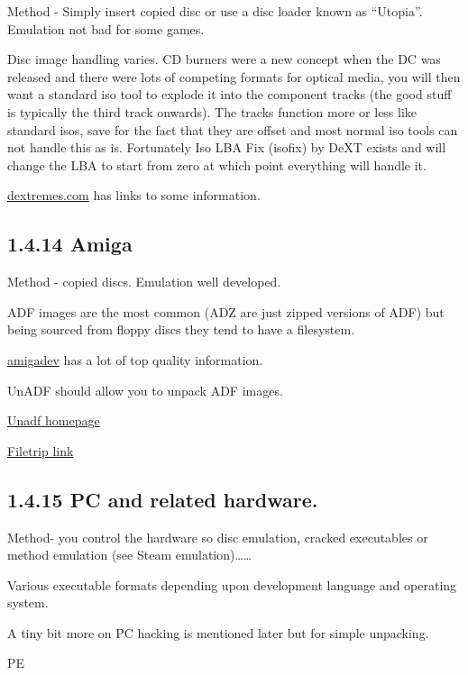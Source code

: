 \documentclass[
]{book}
\begin{document}
Method - Simply insert copied disc or use a disc loader known as ``Utopia''. Emulation not bad for some games.

Disc image handling varies. CD burners were a new concept when the DC was released and there were lots of competing formats for optical media, you will then want a standard iso tool to explode it into the component tracks (the good stuff is typically the third track onwards). The tracks function more or less like standard isos, save for the fact that they are offset and most normal iso tools can not handle this as is. Fortunately Iso LBA Fix (isofix) by DeXT exists and will change the LBA to start from zero at which point everything will handle it.

\href{http://dextremes.com/dc/data/index.html}{dextremes.com} has links to some information.

\hypertarget{amiga}{%
\subsection{1.4.14 Amiga}\label{amiga}}

Method - copied discs. Emulation well developed.

ADF images are the most common (ADZ are just zipped versions of ADF) but being sourced from floppy discs they tend to have a filesystem.

\href{http://amigadev.elowar.com/}{amigadev} has a lot of top quality information.

UnADF should allow you to unpack ADF images.

\href{http://lclevy.free.fr/adflib/unadf.html}{Unadf homepage}

\href{http://filetrip.net/pc-downloads/applications/download-unadf-10-f25764.html}{Filetrip link}

\hypertarget{pc-and-related-hardware.}{%
\subsection{1.4.15 PC and related hardware.}\label{pc-and-related-hardware.}}

Method- you control the hardware so disc emulation, cracked executables or method emulation (see Steam emulation)\ldots\ldots{}

Various executable formats depending upon development language and operating system.

A tiny bit more on PC hacking is mentioned later but for simple unpacking.

PE
\end{document}

